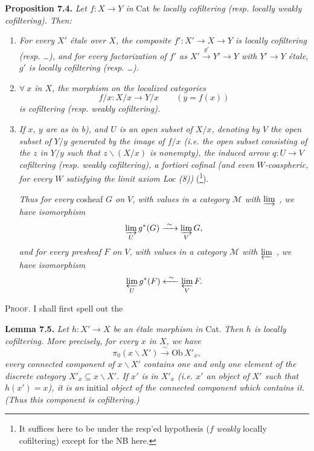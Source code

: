 \documentclass[11pt]{article}
\newcommand{\printedpage}[1]{\marginpar{\footnotesize p.~#1}}
\newcommand{\msp}[1]{\marginpar{\footnotesize [#1]}}
\begin{document}
\textbf{Proposition 7.4.} \textit{Let $f : X \longrightarrow Y$ in} Cat \textit{be locally cofiltering (resp. locally weakly cofiltering). Then:}
\begin{enumerate}
\item[\textit{a)}] \textit{For every $X'$ étale over $X$, the composite $f' : X' \longrightarrow X \longrightarrow Y$ is locally cofiltering (resp. \dots), and for every factorization of $f'$ as $X' \xrightarrow{g'} Y' \longrightarrow Y$ with $Y' \longrightarrow Y$ étale, $g'$ is locally cofiltering (resp. \dots).}
\item[\textit{b)}] \textit{$\forall\ x$ in $X$, the morphism on the localized categories}
\[
f/x : X/x \longrightarrow Y/x \qquad (y = f(x)) %
\]
\textit{is cofiltering (resp. weakly cofiltering).}
\item[\textit{c)}] \textit{If $x$, $y$ are as in b), and $U$ is an open subset of $X/x$, denoting by $V$ the open subset of $Y/y$ generated by the image of $f/x$ (i.e. the open subset consisting of the $z$ in $Y/y$ such that $z\backslash(X/x)$ is nonempty), the induced arrow $q : U \longrightarrow V$} \textit{cofiltering (resp. weakly cofiltering), a fortiori cofinal (and even $W$-coaspheric, for every $W$ satisfying the limit axiom Loc (8))} (\footnote[65]{It suffices here to be under the resp'ed hypothesis ($f$ \textit{weakly} locally cofiltering) except for the NB here. %
}). %

\msp{page 93}
\textit{Thus for every} cosheaf \textit{$G$ on $V$, with values in a category $\mathcal{M}$ with $\varinjlim$ , we have} \textit{isomorphism} %
\[
\varinjlim_U g^*(G) \xrightarrow{\ \sim\ } \varinjlim_V G,
\]
\printedpage{58}
\textit{and for every presheaf $F$ on $V$, with values in a category $\mathcal{M}$ with $\varprojlim$ , we have} \textit{isomorphism}
\[
\varprojlim_U g^*(F) \xleftarrow{\ \sim\ } \varprojlim_V F.
\]
\end{enumerate}

\textsc{Proof}. I shall first spell out the

\textbf{Lemma 7.5.} \textit{Let $h : X' \longrightarrow X$ be an étale morphism in} Cat. \textit{Then $h$ is locally cofiltering. More precisely, for every $x$ in $X$, we have}
\[
\pi_0(x\backslash X') \xrightarrow{\ \sim\ } \mathrm{Ob}\,X'_x,
\]
\textit{every connected component of $x\backslash X'$ contains one and only one element of the discrete category $X'_x \subseteq x\backslash X'$. If $x'$ is in $X'_x$ (i.e. $x'$ an object of $X'$ such that $h(x') = x$), it is an} initial \textit{object of the connected component which contains it. (Thus this component is cofiltering.)}
\end{document}
